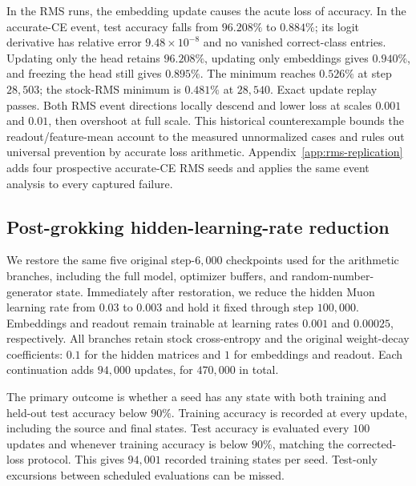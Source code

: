 In the RMS runs, the embedding update causes the acute loss of accuracy. In the accurate-CE event, test accuracy falls from $96.208\%$ to $0.884\%$; its logit derivative has relative error $9.48\times10^{-8}$ and no vanished correct-class entries. Updating only the head retains $96.208\%$, updating only embeddings gives $0.940\%$, and freezing the head still gives $0.895\%$. The minimum reaches $0.526\%$ at step $28{,}503$; the stock-RMS minimum is $0.481\%$ at $28{,}540$. Exact update replay passes. Both RMS event directions locally descend and lower loss at scales $0.001$ and $0.01$, then overshoot at full scale. This historical counterexample bounds the readout/feature-mean account to the measured unnormalized cases and rules out universal prevention by accurate loss arithmetic. Appendix~\ref{app:rms-replication} adds four prospective accurate-CE RMS seeds and applies the same event analysis to every captured failure.

\clearpage
\subsection{Post-grokking hidden-learning-rate reduction}
\label{app:lr-reduction}

We restore the same five original step-$6{,}000$ checkpoints used for the arithmetic branches, including the full model, optimizer buffers, and random-number-generator state. Immediately after restoration, we reduce the hidden Muon learning rate from $0.03$ to $0.003$ and hold it fixed through step $100{,}000$. Embeddings and readout remain trainable at learning rates $0.001$ and $0.00025$, respectively. All branches retain stock cross-entropy and the original weight-decay coefficients: $0.1$ for the hidden matrices and $1$ for embeddings and readout. Each continuation adds $94{,}000$ updates, for $470{,}000$ in total.

The primary outcome is whether a seed has any state with both training and held-out test accuracy below $90\%$. Training accuracy is recorded at every update, including the source and final states. Test accuracy is evaluated every $100$ updates and whenever training accuracy is below $90\%$, matching the corrected-loss protocol. This gives $94{,}001$ recorded training states per seed. Test-only excursions between scheduled evaluations can be missed.

